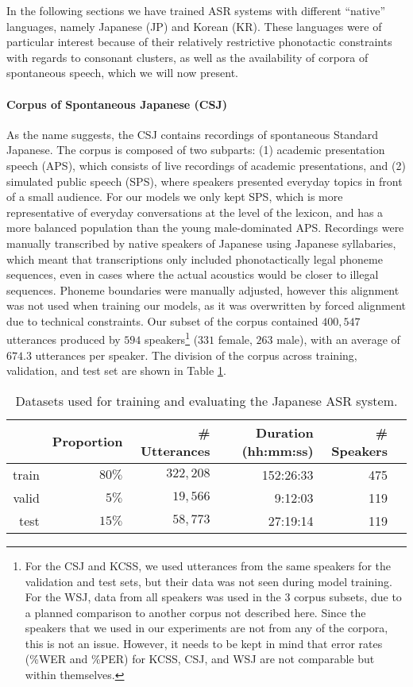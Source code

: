 In the following sections we have trained ASR systems with different ``native'' languages, namely Japanese (JP) and Korean (KR). These languages were of particular interest because of their relatively restrictive phonotactic constraints with regards to consonant clusters, as well as the availability of corpora of spontaneous speech, which we will now present. 

\paragraph{Corpus of Spontaneous Japanese (CSJ)}
As the name suggests, the CSJ \cite{maekawa2003} contains recordings of spontaneous Standard Japanese. The corpus is composed of two subparts: (1) academic presentation speech (APS), which consists of live recordings of academic presentations, and (2) simulated public speech (SPS), where speakers presented everyday topics in front of a small audience. For our models we only kept SPS, which is more representative of everyday conversations at the level of the lexicon, and has a more balanced population than the young male-dominated APS.
Recordings were manually transcribed by native speakers of Japanese using Japanese syllabaries, which meant that transcriptions only included phonotactically legal phoneme sequences, even in cases where the actual acoustics would be closer to illegal sequences. Phoneme boundaries were manually adjusted, however this alignment was not used when training our models, as it was overwritten by forced alignment due to technical constraints.
Our subset of the corpus contained $400,547$ utterances produced by $594$ speakers\footnote{For the CSJ and KCSS, we used utterances from the same speakers for the validation and test sets, but their data was not seen during model training. For the WSJ, data from all speakers was used in the 3 corpus subsets, due to a planned comparison to another corpus not described here. Since the speakers that we used in our experiments are not from any of the corpora, this is not an issue. However, it needs to be kept in mind that error rates (\%WER and \%PER) for KCSS, CSJ, and WSJ are not comparable but within themselves.} ($331$ female, $263$ male), with an average of $674.3$ utterances per speaker. The division of the corpus across training, validation, and test set are shown in Table \ref{tab:hmm_csj}.

\begin{table}[htb]
\centering
\caption{Datasets used for training and evaluating the Japanese ASR system.}
\label{tab:hmm_csj}
\vspace{0.25cm}
\begin{tabular}{rrrrrr}
  \toprule
      & Proportion &\# Utterances & Duration (hh:mm:ss) & \# Speakers &  \\ \midrule
  train & $80\%$ &  $322,208$            & 152:26:33     &   475          &  \\
  valid & $5\%$ &  $19,566$         &  9:12:03    &   119          &  \\
  test  & $15\%$ &  $58,773$        &  27:19:14    &  119           & \\ \bottomrule
\end{tabular}
\end{table}

